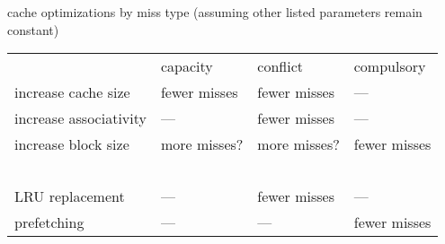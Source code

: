 

\begin{frame}{cache optimizations by miss type}
\newcommand{\good}{\textcolor{green!50!black}{fewer misses}}
\newcommand{\bad}{\textcolor{red!50!black}{more misses}}
(assuming other listed parameters remain constant)
\begin{tabular}{llll}
    ~ & capacity & conflict & compulsory \\
increase cache size & \good & \good & --- \\
increase associativity & --- & \good & --- \\
increase block size & \bad? & \bad? & \good \\
~ \\
LRU replacement & --- & \good & --- \\
prefetching & --- & --- & \good \\
\end{tabular}
\end{frame}

